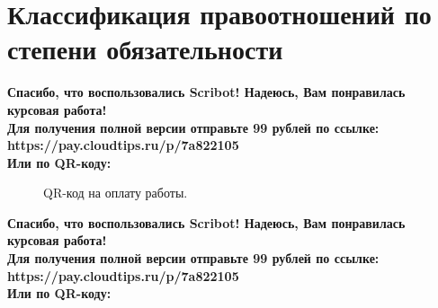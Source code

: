 \documentclass{article}
\begin{document}
\section{Классификация правоотношений по степени обязательности}
\begin{center}
    \textbf{
        Спасибо, что воспользовались Scribot! Надеюсь, Вам понравилась курсовая работа!\\
        Для получения полной версии отправьте 99 рублей по ссылке:\\
        https://pay.cloudtips.ru/p/7a822105\\
        Или по QR-коду:\\
    }
\end{center}
\begin{figure}[h]
    \caption{QR-код на оплату работы.}
    \label{ris:image}
\end{figure}
\newpage
\begin{center}
    \textbf{
        Спасибо, что воспользовались Scribot! Надеюсь, Вам понравилась курсовая работа!\\
        Для получения полной версии отправьте 99 рублей по ссылке:\\
        https://pay.cloudtips.ru/p/7a822105\\
        Или по QR-коду:\\
    }
\end{center}
\end{document}
